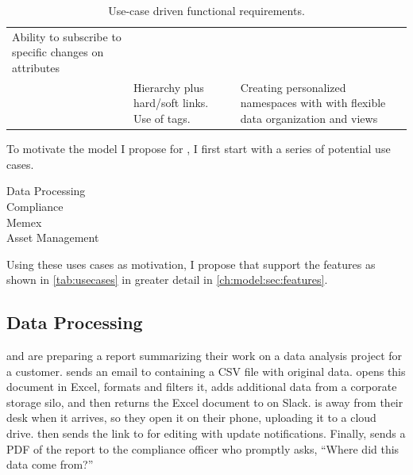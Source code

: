 \begin{table}[!tbh]
{\begin{tabular}{p{}p{}p{}}
            Ability to subscribe to specific changes on attributes
            \\
            \usecasepersnamespace                                                                                                                                   &
            Hierarchy plus hard/soft links. Use of tags.                                                                                                            &
            Creating personalized namespaces with with flexible data organization and views
            \\
            \hline
        \end{tabular}
    }
    \caption{Use-case driven functional requirements.}
    \label{tab:usecases}
\end{table}

To motivate the model I propose for \system, I first start with a series of
potential use cases. 

\begin{description}
    \item[Data Processing]
    \item[Compliance]
    \item[Memex]
    \item[Asset Management]
\end{description}

Using these uses cases as motivation, I propose that \system support the
features as shown in \autoref{tab:usecases} in greater detail in \autoref{ch:model:sec:features}.

\subsection{Data Processing}
\label{ch:model:sec:use-cases:subsec:data-processing}


\persa and \persc are preparing a report summarizing their work on a data analysis project for a customer.
\persc sends an email to \persa containing a CSV file with original data.
\persa opens this document in Excel, formats and filters it, adds additional data from a corporate storage silo,
and then returns the Excel document to \persc on Slack.
\persc is away from their desk when it arrives, so they open it on their phone, uploading it to a cloud drive.
\persc then sends the link to \persa for editing with update notifications.
Finally, \persc sends a PDF of the report to the compliance officer who promptly asks, ``Where did this data come from?''

